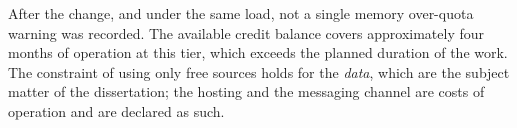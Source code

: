 After the change, and under the same load, not a single memory over-quota warning was recorded.
The available credit balance covers approximately four months of operation at this tier, which
exceeds the planned duration of the work. The constraint of using only free sources holds for the
\emph{data}, which are the subject matter of the dissertation; the hosting and the messaging
channel are costs of operation and are declared as such.
